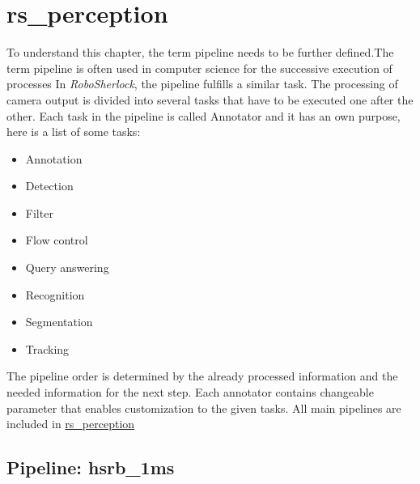 \documentclass[main.tex]{subfiles}
\begin{document}
		\section{rs\_perception}
To understand this chapter, the term pipeline needs to be further defined.The term pipeline is often used in computer science for the successive execution of processes
In \textit{RoboSherlock}, the pipeline fulfills a similar task. The processing of camera output is divided into several tasks that have to be executed one after the other.
Each task in the pipeline is called Annotator and it has an own purpose, here is a list of some tasks: 
		\begin{itemize}
			\item Annotation
			\item Detection
			\item Filter
			\item Flow control
			\item Query answering
			\item Recognition 
			\item Segmentation
			\item Tracking
		\end{itemize}		
The pipeline order is determined by the already processed information and the needed information for the next step.
Each annotator contains changeable parameter that enables customization to the given tasks. All main pipelines are included in \href{https://github.com/SUTURO/suturo_perception/tree/master/rs_perception}{rs\_perception}

			\subsection{Pipeline: hsrb\_1ms}
\end{document}
